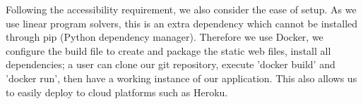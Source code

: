 Following the accessibility requirement, we also consider the ease of setup. As we use linear program solvers, this is an extra dependency which cannot be installed through pip (Python dependency manager). Therefore we use Docker, we configure the build file to create and package the static web files, install all dependencies; a user can clone our git repository, execute 'docker build' and 'docker run', then have a working instance of our application. This also allows us to easily deploy to cloud platforms such as Heroku.